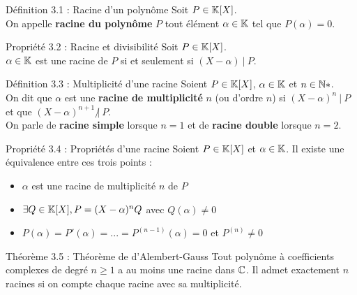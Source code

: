 \begin{theorem}[red]{Définition 3.1 : Racine d'un polynôme}
    Soit $P \in \mathbb{K}[X]$. \\
    On appelle \textbf{racine du polynôme} $P$ tout élément $\alpha \in \mathbb{K}$ tel que $P(\alpha) = 0$.
\end{theorem}

\begin{theorem}[blue]{Propriété 3.2 : Racine et divisibilité}
    Soit $P \in \mathbb{K}[X]$. \\
    $\alpha \in \mathbb{K}$ est une racine de $P$ si et seulement si $(X - \alpha) \ | \ P$. 
\end{theorem}

\begin{theorem}[red]{Définition 3.3 : Multiplicité d'une racine}
    Soient $P \in \mathbb{K}[X]$, $\alpha \in \mathbb{K}$ et $n \in \mathbb{N}*$. \\
    On dit que $\alpha$ est une \textbf{racine de multiplicité} $n$ (ou d'ordre $n$) si $(X - \alpha)^n \ | \ P$ et que $(X - \alpha)^{n + 1} \ \not| \ P$. \\

    \noindent On parle de \textbf{racine simple} lorsque $n = 1$ et de \textbf{racine double} lorsque $n = 2$.
\end{theorem}

\begin{theorem}[blue]{Propriété 3.4 : Propriétés d'une racine}
    Soient $P \in \mathbb{K}[X]$ et $\alpha \in \mathbb{K}$.
    Il existe une équivalence entre ces trois points :

    \begin{itemize}
        \item $\alpha$ est une racine de multiplicité $n$ de $P$
        \item $\exists Q \in \mathbb{K}[X], P = (X - \alpha)^nQ$  avec $Q(\alpha) \neq 0$
        \item $P(\alpha) = P'(\alpha) = ... = P^{(n - 1)}(\alpha) = 0$ et $P^{(n)} \neq 0$
    \end{itemize}
\end{theorem}

\begin{theorem}[orange]{Théorème 3.5 : Théorème de d'Alembert-Gauss}
    Tout polynôme à coefficients complexes de degré $n \geq 1$ a au moins une racine dans $\mathbb{C}$. Il admet exactement $n$ racines si on compte chaque racine avec sa multiplicité.
\end{theorem}

